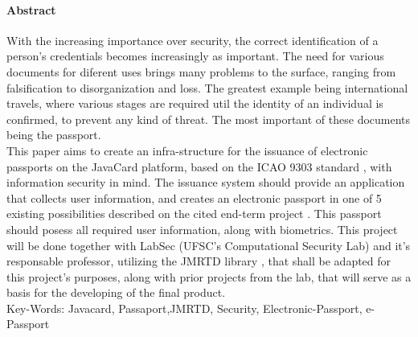 \documentclass{article}
\begin{document}
	\paragraph{\large Abstract}
		\begin{flushleft}

			\hspace{2cm} With the increasing importance over security, the correct identification of a person's credentials becomes increasingly as important. The need for various documents for diferent uses brings many problems to the surface, ranging from falsification to disorganization and loss.
The greatest example being international travels, where various stages are required util the identity of an individual is confirmed, to prevent any kind of threat. The most important of these documents being the passport.\\
			\hspace{2cm} 
			This paper aims to create an infra-structure for the issuance of electronic passports on the JavaCard platform, based on the ICAO 9303 standard \cite{ICAO}, with information security in mind. The issuance system should provide an application that collects user information, and creates an electronic passport in one of 5 existing possibilities described on the cited end-term project \cite{SASSO}. This passport should posess all required user information, along with biometrics. This project will be done together with LabSec (UFSC's Computational Security Lab) and it's responsable professor, utilizing the JMRTD library \cite{JMRTD}, that shall be adapted for this project's purposes, along with prior projects from the lab, that will serve as a basis for the developing of the final product.\\

	\vspace{10px}
Key-Words: Javacard, Passaport,JMRTD, Security, Electronic-Passport, e-Passport

		\end{flushleft}
	
	\newpage

	\tableofcontents
	\newpage


	
\end{document}
